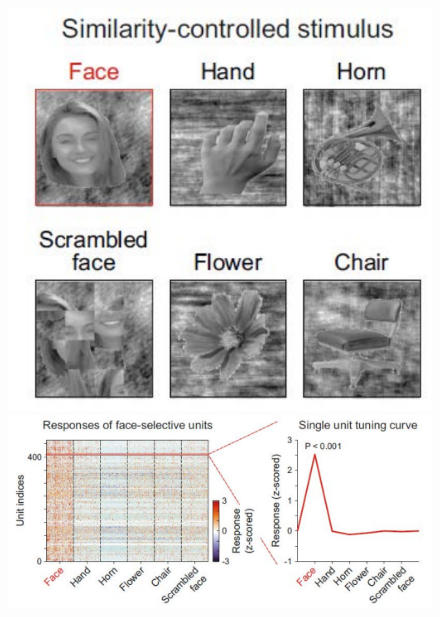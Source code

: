 \documentclass[final,3p,times,twocolumn]{elsarticle}
\begin{document}
\begin{figure}[htbp]
	\centering
	
	\subfigure%
	{
		\begin{minipage}[t]{1.0\linewidth}
			\centering
			\includegraphics[width=1.0\textwidth]{figs/fig_1_c.pdf}
		\end{minipage}%
	}%
	
	\subfigure%
	{
		\begin{minipage}[t]{1.0\linewidth}
			\centering
			\includegraphics[width=1.0\textwidth]{figs/fig_1_d.pdf}
		\end{minipage}
	}%


\end{figure}
\end{document}

